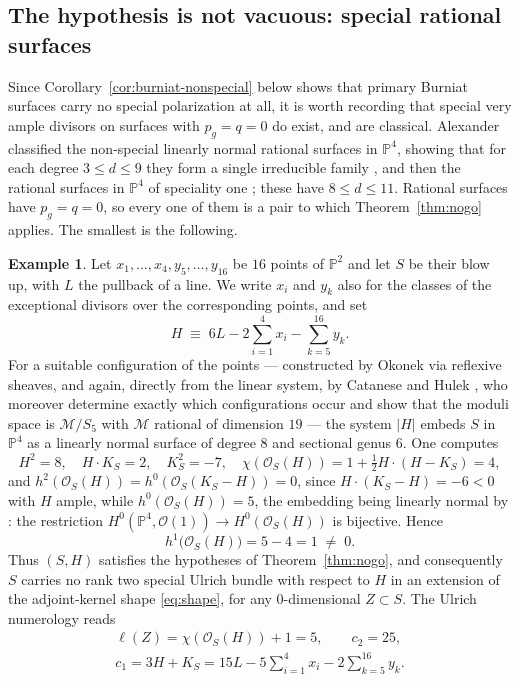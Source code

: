 \documentclass{amsart}
\theoremstyle{definition}
\newtheorem{example}[theorem]{Example}
\newcommand{\OO}{\mathcal{O}}
\newcommand{\PP}{\mathbb{P}}
\newcommand{\len}{\ell}
\begin{document}
\subsection{The hypothesis is not vacuous: special rational surfaces}\label{subsec:special-rational}
Since Corollary~\ref{cor:burniat-nonspecial} below shows that primary Burniat surfaces carry no special polarization at all, it is worth recording that special very ample divisors on surfaces with $p_g=q=0$ do exist, and are classical. Alexander classified the non-special linearly normal rational surfaces in $\PP^4$, showing that for each degree $3\le d\le9$ they form a single irreducible family \cite{Al88}, and then the rational surfaces in $\PP^4$ of speciality one \cite{Al92}; these have $8\le d\le11$. Rational surfaces have $p_g=q=0$, so every one of them is a pair to which Theorem~\ref{thm:nogo} applies. The smallest is the following.

\begin{example}\label{ex:special-rational}
Let $x_1,\dots,x_4,y_5,\dots,y_{16}$ be $16$ points of $\PP^2$ and let $S$ be their blow up, with $L$ the pullback of a line. We write $x_i$ and $y_k$ also for the classes of the exceptional divisors over the corresponding points, and set
\[
H\;\equiv\;6L-2\sum_{i=1}^{4}x_i-\sum_{k=5}^{16}y_k .
\]
For a suitable configuration of the points --- constructed by Okonek \cite{Ok86} via reflexive sheaves, and again, directly from the linear system, by Catanese and Hulek \cite[Thm.~III.17]{CH97}, who moreover determine exactly which configurations occur \cite[Thm.~III.14]{CH97} and show that the moduli space is $\mathcal M/S_5$ with $\mathcal M$ rational of dimension $19$ \cite[Thm.~III.20]{CH97} --- the system $|H|$ embeds $S$ in $\PP^4$ as a linearly normal surface of degree $8$ and sectional genus $6$. One computes
\[
H^2=8,\quad H\cdot K_S=2,\quad K_S^2=-7,\quad \chi(\OO_S(H))=1+\tfrac12H\cdot(H-K_S)=4,
\]
and $h^2(\OO_S(H))=h^0(\OO_S(K_S-H))=0$, since $H\cdot(K_S-H)=-6<0$ with $H$ ample, while $h^0(\OO_S(H))=5$, the embedding being linearly normal by \cite[Thm.~III.17]{CH97}: the restriction $H^0(\PP^4,\OO(1))\to H^0(\OO_S(H))$ is bijective. Hence
\[
h^1\bigl(\OO_S(H)\bigr)=5-4=1\;\neq\;0 .
\]
Thus $(S,H)$ satisfies the hypotheses of Theorem~\ref{thm:nogo}, and consequently $S$ carries no rank two special Ulrich bundle with respect to $H$ in an extension of the adjoint-kernel shape \eqref{eq:shape}, for any $0$-dimensional $Z\subset S$. The Ulrich numerology reads
\[
\begin{gathered}
\len(Z)=\chi(\OO_S(H))+1=5,\qquad c_2=25,\\
c_1=3H+K_S=15L-5\textstyle\sum_{i=1}^{4} x_i-2\sum_{k=5}^{16} y_k .
\end{gathered}
\]
\end{example}
\end{document}
